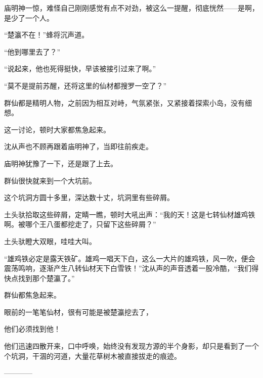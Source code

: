 \begin{this_body}
庙明神一惊，难怪自己刚刚感觉有点不对劲，被这么一提醒，彻底恍然——是啊，是少了一个人。

“楚瀛不在！”蜂将沉声道。

“他到哪里去了？”

“说起来，他也死得挺快，早该被接引过来了啊。”

“莫不是提前苏醒，还将这里的仙材都搜罗一空了？”

群仙都是精明人物，之前因为相互对峙，气氛紧张，又紧接着探索小岛，没有细想。

这一讨论，顿时大家都焦急起来。

沈从声也不顾再跟着庙明神了，当即往前疾走。

庙明神犹豫了一下，还是跟了上去。

群仙很快就来到一个大坑前。

这个坑洞方圆十多里，深达数十丈，坑洞里有些碎屑。

土头驮拾取这些碎屑，定睛一瞧，顿时大吼出声：“我的天！这是七转仙材雄鸡铁啊。被哪个王八蛋都挖走了，只留下这些碎屑？”

土头驮瞪大双眼，哇哇大叫。

“雄鸡铁必定是露天铁矿。雄鸡一唱天下白，这么一大片的雄鸡铁，风一吹，便会震荡鸣响，逐渐产生八转仙材天下白雪铁！”沈从声的声音透着一股冷酷，“我们得快点找到那个楚瀛了。”

群仙都焦急起来。

眼前的一笔笔仙材，很有可能是被楚瀛挖去了，

他们必须找到他！

他们迅速四散开来，口中呼唤，始终没有发现方源的半个身影，却只是看到了一个个坑洞，干涸的河道，大量花草树木被直接拔走的痕迹。

------------

\end{this_body}

